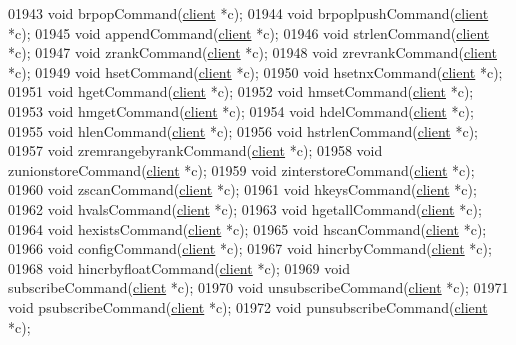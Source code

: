 \begin{DoxyCode}
{{{{{{{01943 \textcolor{keywordtype}{void} brpopCommand(\hyperlink{structclient}{client} *c);
01944 \textcolor{keywordtype}{void} brpoplpushCommand(\hyperlink{structclient}{client} *c);
01945 \textcolor{keywordtype}{void} appendCommand(\hyperlink{structclient}{client} *c);
01946 \textcolor{keywordtype}{void} strlenCommand(\hyperlink{structclient}{client} *c);
01947 \textcolor{keywordtype}{void} zrankCommand(\hyperlink{structclient}{client} *c);
01948 \textcolor{keywordtype}{void} zrevrankCommand(\hyperlink{structclient}{client} *c);
01949 \textcolor{keywordtype}{void} hsetCommand(\hyperlink{structclient}{client} *c);
01950 \textcolor{keywordtype}{void} hsetnxCommand(\hyperlink{structclient}{client} *c);
01951 \textcolor{keywordtype}{void} hgetCommand(\hyperlink{structclient}{client} *c);
01952 \textcolor{keywordtype}{void} hmsetCommand(\hyperlink{structclient}{client} *c);
01953 \textcolor{keywordtype}{void} hmgetCommand(\hyperlink{structclient}{client} *c);
01954 \textcolor{keywordtype}{void} hdelCommand(\hyperlink{structclient}{client} *c);
01955 \textcolor{keywordtype}{void} hlenCommand(\hyperlink{structclient}{client} *c);
01956 \textcolor{keywordtype}{void} hstrlenCommand(\hyperlink{structclient}{client} *c);
01957 \textcolor{keywordtype}{void} zremrangebyrankCommand(\hyperlink{structclient}{client} *c);
01958 \textcolor{keywordtype}{void} zunionstoreCommand(\hyperlink{structclient}{client} *c);
01959 \textcolor{keywordtype}{void} zinterstoreCommand(\hyperlink{structclient}{client} *c);
01960 \textcolor{keywordtype}{void} zscanCommand(\hyperlink{structclient}{client} *c);
01961 \textcolor{keywordtype}{void} hkeysCommand(\hyperlink{structclient}{client} *c);
01962 \textcolor{keywordtype}{void} hvalsCommand(\hyperlink{structclient}{client} *c);
01963 \textcolor{keywordtype}{void} hgetallCommand(\hyperlink{structclient}{client} *c);
01964 \textcolor{keywordtype}{void} hexistsCommand(\hyperlink{structclient}{client} *c);
01965 \textcolor{keywordtype}{void} hscanCommand(\hyperlink{structclient}{client} *c);
01966 \textcolor{keywordtype}{void} configCommand(\hyperlink{structclient}{client} *c);
01967 \textcolor{keywordtype}{void} hincrbyCommand(\hyperlink{structclient}{client} *c);
01968 \textcolor{keywordtype}{void} hincrbyfloatCommand(\hyperlink{structclient}{client} *c);
01969 \textcolor{keywordtype}{void} subscribeCommand(\hyperlink{structclient}{client} *c);
01970 \textcolor{keywordtype}{void} unsubscribeCommand(\hyperlink{structclient}{client} *c);
01971 \textcolor{keywordtype}{void} psubscribeCommand(\hyperlink{structclient}{client} *c);
01972 \textcolor{keywordtype}{void} punsubscribeCommand(\hyperlink{structclient}{client} *c);
}}}}}}}
\end{DoxyCode}
